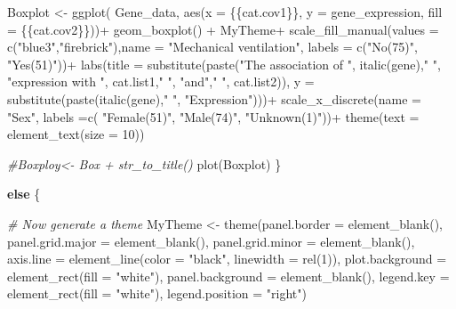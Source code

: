 \documentclass[
]{article}
\newenvironment{Shaded}{\begin{snugshade}}{\end{snugshade}}
\newcommand{\AttributeTok}[1]{\textcolor[rgb]{0.77,0.63,0.00}{#1}}
\newcommand{\CommentTok}[1]{\textcolor[rgb]{0.56,0.35,0.01}{\textit{#1}}}
\newcommand{\ControlFlowTok}[1]{\textcolor[rgb]{0.13,0.29,0.53}{\textbf{#1}}}
\newcommand{\DecValTok}[1]{\textcolor[rgb]{0.00,0.00,0.81}{#1}}
\newcommand{\FunctionTok}[1]{\textcolor[rgb]{0.00,0.00,0.00}{#1}}
\newcommand{\NormalTok}[1]{#1}
\newcommand{\OtherTok}[1]{\textcolor[rgb]{0.56,0.35,0.01}{#1}}
\newcommand{\SpecialCharTok}[1]{\textcolor[rgb]{0.00,0.00,0.00}{#1}}
\newcommand{\StringTok}[1]{\textcolor[rgb]{0.31,0.60,0.02}{#1}}
\begin{document}
\begin{Shaded}
\begin{Highlighting}[]
\NormalTok{Boxplot }\OtherTok{\textless{}{-}} \FunctionTok{ggplot}\NormalTok{( Gene\_data, }\FunctionTok{aes}\NormalTok{(}\AttributeTok{x =}\NormalTok{ \{\{cat.cov1\}\}, }\AttributeTok{y =}\NormalTok{ gene\_expression, }\AttributeTok{fill =}\NormalTok{ \{\{cat.cov2\}\}))}\SpecialCharTok{+}
  \FunctionTok{geom\_boxplot}\NormalTok{() }\SpecialCharTok{+}
\NormalTok{  MyTheme}\SpecialCharTok{+}
  \FunctionTok{scale\_fill\_manual}\NormalTok{(}\AttributeTok{values =} \FunctionTok{c}\NormalTok{(}\StringTok{"blue3"}\NormalTok{,}\StringTok{"firebrick"}\NormalTok{),}\AttributeTok{name =} \StringTok{"Mechanical ventilation"}\NormalTok{, }\AttributeTok{labels =} \FunctionTok{c}\NormalTok{(}\StringTok{"No(75)"}\NormalTok{, }\StringTok{"Yes(51)"}\NormalTok{))}\SpecialCharTok{+}
  \FunctionTok{labs}\NormalTok{(}\AttributeTok{title =} \FunctionTok{substitute}\NormalTok{(}\FunctionTok{paste}\NormalTok{(}\StringTok{"The association of "}\NormalTok{, }\FunctionTok{italic}\NormalTok{(gene),}\StringTok{" "}\NormalTok{, }\StringTok{"expression with "}\NormalTok{, cat.list1,}\StringTok{" "}\NormalTok{, }\StringTok{"and"}\NormalTok{,}\StringTok{" "}\NormalTok{, cat.list2)), }\AttributeTok{y =} \FunctionTok{substitute}\NormalTok{(}\FunctionTok{paste}\NormalTok{(}\FunctionTok{italic}\NormalTok{(gene),}\StringTok{" "}\NormalTok{, }\StringTok{"Expression"}\NormalTok{)))}\SpecialCharTok{+}
  \FunctionTok{scale\_x\_discrete}\NormalTok{(}\AttributeTok{name =} \StringTok{"Sex"}\NormalTok{, }\AttributeTok{labels =}\FunctionTok{c}\NormalTok{( }\StringTok{"Female(51)"}\NormalTok{, }\StringTok{"Male(74)"}\NormalTok{, }\StringTok{"Unknown(1)"}\NormalTok{))}\SpecialCharTok{+}
  \FunctionTok{theme}\NormalTok{(}\AttributeTok{text =} \FunctionTok{element\_text}\NormalTok{(}\AttributeTok{size =} \DecValTok{10}\NormalTok{))}

\CommentTok{\#Boxploy\textless{}{-} Box + str\_to\_title()}
\FunctionTok{plot}\NormalTok{(Boxplot)}
\NormalTok{  \}}
  
  \ControlFlowTok{else}\NormalTok{ \{}

     \CommentTok{\# Now generate a theme}
\NormalTok{  MyTheme }\OtherTok{\textless{}{-}} \FunctionTok{theme}\NormalTok{(}\AttributeTok{panel.border =} \FunctionTok{element\_blank}\NormalTok{(), }\AttributeTok{panel.grid.major =} \FunctionTok{element\_blank}\NormalTok{(), }\AttributeTok{panel.grid.minor =} \FunctionTok{element\_blank}\NormalTok{(), }\AttributeTok{axis.line =} \FunctionTok{element\_line}\NormalTok{(}\AttributeTok{color =} \StringTok{"black"}\NormalTok{, }\AttributeTok{linewidth =} \FunctionTok{rel}\NormalTok{(}\DecValTok{1}\NormalTok{)), }\AttributeTok{plot.background =} \FunctionTok{element\_rect}\NormalTok{(}\AttributeTok{fill =} \StringTok{"white"}\NormalTok{), }\AttributeTok{panel.background =} \FunctionTok{element\_blank}\NormalTok{(), }\AttributeTok{legend.key =} \FunctionTok{element\_rect}\NormalTok{(}\AttributeTok{fill =} \StringTok{"white"}\NormalTok{), }\AttributeTok{legend.position =} \StringTok{"right"}\NormalTok{)}
  

\end{Highlighting}
\end{Shaded}
\end{document}
